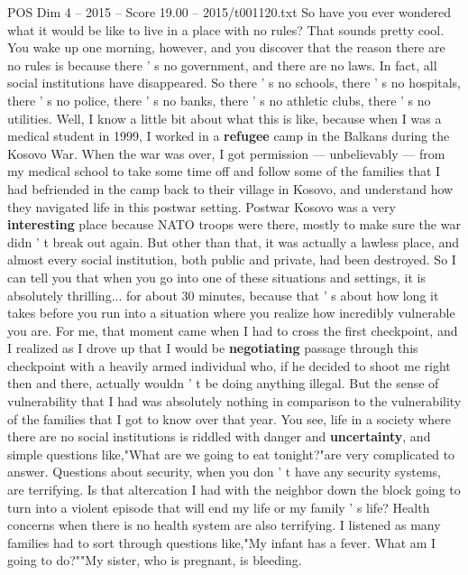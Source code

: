 \begin{textsample}{POS Dim 4 – 2015 – Score 19.00 – 2015/t001120.txt}  \label{ex:f4_pos_053}
So have you ever wondered what it would be like to live in a place with no rules?
That sounds pretty cool.
You wake up one morning, however, and you discover that the reason there are no rules is because there ' s no government, and there are no laws.
In fact, all social institutions have disappeared.
So there ' s no schools, there ' s no hospitals, there ' s no police, there ' s no banks, there ' s no athletic clubs, there ' s no utilities.
Well, I know a little bit about what this is like, because when I was a medical student in 1999, I worked in a \textbf{refugee} camp in the Balkans during the Kosovo War.
When the war was over, I got permission — unbelievably — from my medical school to take some time off and follow some of the families that I had befriended in the camp back to their village in Kosovo, and understand how they navigated life in this postwar setting.
Postwar Kosovo was a very \textbf{interesting} place because NATO troops were there, mostly to make sure the war didn ' t break out again.
But other than that, it was actually a lawless place, and almost every social institution, both public and private, had been destroyed.
So I can tell you that when you go into one of these situations and settings, it is absolutely thrilling... for about 30 minutes, because that ' s about how long it takes before you run into a situation where you realize how incredibly vulnerable you are.
For me, that moment came when I had to cross the first checkpoint, and I realized as I drove up that I would be \textbf{negotiating} passage through this checkpoint with a heavily armed individual who, if he decided to shoot me right then and there, actually wouldn ' t be doing anything illegal.
But the sense of vulnerability that I had was absolutely nothing in comparison to the vulnerability of the families that I got to know over that year.
You see, life in a society where there are no social institutions is riddled with danger and \textbf{uncertainty}, and simple questions like,"What are we going to eat tonight?"are very complicated to answer.
Questions about security, when you don ' t have any security systems, are terrifying.
Is that altercation I had with the neighbor down the block going to turn into a violent episode that will end my life or my family ' s life?
Health concerns when there is no health system are also terrifying.
I listened as many families had to sort through questions like,"My infant has a fever.
What am I going to do?""My sister, who is pregnant, is bleeding.

\end{textsample}
